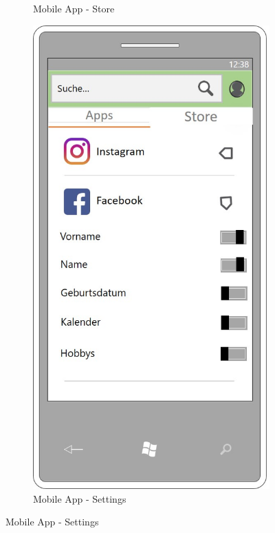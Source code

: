 \begin{figure}[!ht]
\begin{subfigure}{0.32\linewidth}
		\caption{Mobile App - Store}
		\label{fig:prototyp1}
	\end{subfigure}%
	\begin{subfigure}{0.32\linewidth}
		\centering
		\includegraphics[width=1\linewidth]{Picture/App-Settings}
		\caption{Mobile App - Settings}
		\label{fig:prototyp2}

\end{subfigure}
\end{figure}
